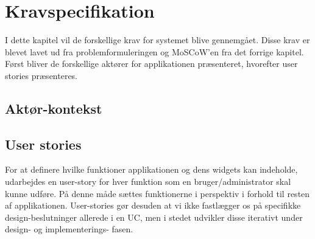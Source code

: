 \chapter{Kravspecifikation}
I dette kapitel vil de forskellige krav for systemet blive gennemgået. Disse krav er blevet lavet ud fra problemformuleringen og MoSCoW'en fra det forrige kapitel. Først bliver de forskellige aktører for applikationen præsenteret, hvorefter user stories præsenteres.
\section{Aktør-kontekst}


\section{User stories}
For at definere hvilke funktioner applikationen og dens widgets kan indeholde, udarbejdes en user-story for hver funktion som en bruger/administrator skal kunne udføre. På denne måde sættes funktionerne i perspektiv i forhold til resten af applikationen. User-stories gør desuden at vi ikke fastlægger os på specifikke design-beslutninger allerede i en UC, men i stedet udvikler disse iterativt under design- og implementerings- fasen. 
